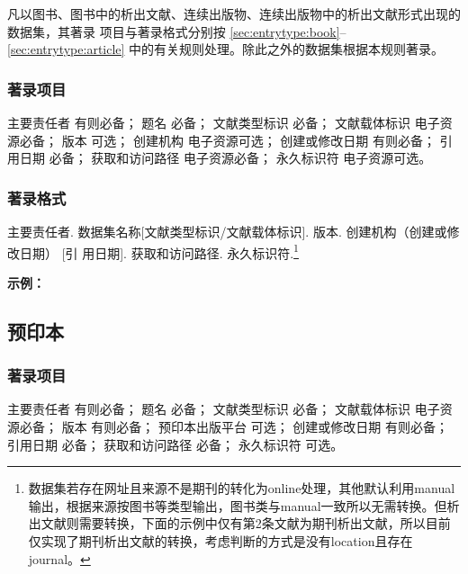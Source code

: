 \documentclass[twoside]{article}%
\begin{document}
凡以图书、图书中的析出文献、连续出版物、连续出版物中的析出文献形式出现的数据集，其著录
项目与著录格式分别按 \ref{sec:entrytype:book}--\ref{sec:entrytype:article} 中的有关规则处理。除此之外的数据集根据本规则著录。

\subsubsection{著录项目}

主要责任者 有则必备；
题名 必备；
文献类型标识 必备；
文献载体标识 电子资源必备；
版本 可选；
创建机构 电子资源可选；
创建或修改日期 有则必备；
引用日期 必备；
获取和访问路径 电子资源必备；
永久标识符 电子资源可选。

\subsubsection{著录格式}
主要责任者. 数据集名称[文献类型标识/文献载体标识]. 版本. 创建机构（创建或修改日期） [引
用日期]. 获取和访问路径. 永久标识符.\footnote{数据集若存在网址且来源不是期刊的转化为online处理，其他默认利用manual输出，根据来源按图书等类型输出，图书类与manual一致所以无需转换。但析出文献则需要转换，下面的示例中仅有第2条文献为期刊析出文献，所以目前仅实现了期刊析出文献的转换，考虑判断的方式是没有location且存在journal。}

\begin{refsection}

\nocite{草地数据1994--,李皓2024语料库,彭守璋2024降水,刘时银2012水川,仲晓雅2022夜间灯光,仲晓雅2022夜间灯光en,IHME2021Disease,郑涵2018生态}


\textbf{示例：}

{\printbibliography[heading=none,env=indentegenv]}

\end{refsection}


\subsection{预印本}\label{sec:entrytype:preprint}


\subsubsection{著录项目}

主要责任者 有则必备；
题名 必备；
文献类型标识 必备；
文献载体标识 电子资源必备；
版本 有则必备；
预印本出版平台 可选；
创建或修改日期 有则必备；
引用日期 必备；
获取和访问路径 必备；
永久标识符 可选。
\end{document}
